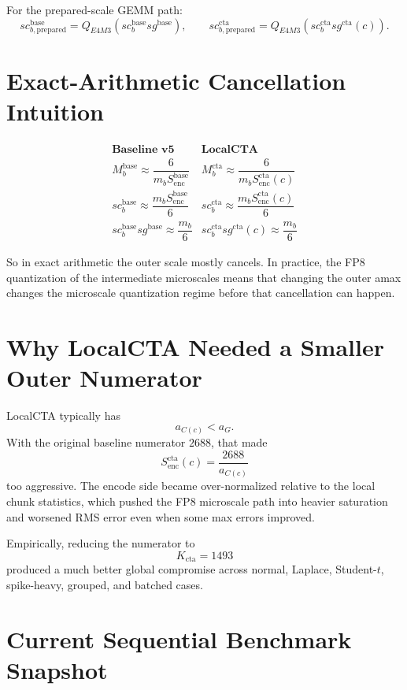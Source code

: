 \documentclass[11pt]{article}
\begin{document}
For the prepared-scale GEMM path:
\[
sc_{b,\mathrm{prepared}}^{\mathrm{base}} = Q_{E4M3}\!\left(sc_b^{\mathrm{base}} sg^{\mathrm{base}}\right),
\qquad
sc_{b,\mathrm{prepared}}^{\mathrm{cta}} = Q_{E4M3}\!\left(sc_b^{\mathrm{cta}} sg^{\mathrm{cta}}(c)\right).
\]

\section{Exact-Arithmetic Cancellation Intuition}

\[
\begin{array}{c|c}
\textbf{Baseline v5} & \textbf{LocalCTA} \\
\hline
M_b^{\mathrm{base}} \approx \dfrac{6}{m_b S_{\mathrm{enc}}^{\mathrm{base}}} &
M_b^{\mathrm{cta}} \approx \dfrac{6}{m_b S_{\mathrm{enc}}^{\mathrm{cta}}(c)} \\

sc_b^{\mathrm{base}} \approx \dfrac{m_b S_{\mathrm{enc}}^{\mathrm{base}}}{6} &
sc_b^{\mathrm{cta}} \approx \dfrac{m_b S_{\mathrm{enc}}^{\mathrm{cta}}(c)}{6} \\

sc_b^{\mathrm{base}} sg^{\mathrm{base}} \approx \dfrac{m_b}{6} &
sc_b^{\mathrm{cta}} sg^{\mathrm{cta}}(c) \approx \dfrac{m_b}{6}
\end{array}
\]

So in exact arithmetic the outer scale mostly cancels. In practice, the FP8 quantization of the intermediate microscales means that changing the outer amax changes the microscale quantization regime before that cancellation can happen.

\section{Why LocalCTA Needed a Smaller Outer Numerator}

LocalCTA typically has
\[
a_{C(c)} < a_G.
\]
With the original baseline numerator \(2688\), that made
\[
S_{\mathrm{enc}}^{\mathrm{cta}}(c) = \frac{2688}{a_{C(c)}}
\]
too aggressive. The encode side became over-normalized relative to the local chunk statistics, which pushed the FP8 microscale path into heavier saturation and worsened RMS error even when some max errors improved.

Empirically, reducing the numerator to
\[
K_{\mathrm{cta}} = 1493
\]
produced a much better global compromise across normal, Laplace, Student-$t$, spike-heavy, grouped, and batched cases.

\section{Current Sequential Benchmark Snapshot}
\end{document}
